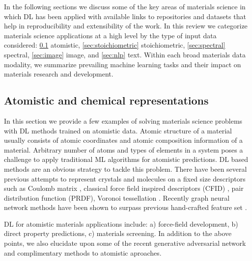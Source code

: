 \documentclass[pdflatex,sn-mathphys]{sn-jnl}%
\theoremstyle{thmstyleone}%
\theoremstyle{thmstyletwo}%
\theoremstyle{thmstylethree}%
\begin{document}



In the following sections we discuss some of the key areas of materials science in which DL has been applied with available links to repositories and datasets that help in reproducibility and extensibility of the work.
In this review we categorize materials science applications at a high level by the type of input data considered: \ref{sec:atomistic} atomistic, \ref{sec:stoichiometric} stoichiometric, \ref{sec:spectral} spectral, \ref{sec:image} image, and \ref{sec:nlp} text.
Within each broad materials data modality, we summarize prevailing machine learning tasks and their impact on materials research and development.


\subsection{Atomistic and chemical representations}\label{sec:atomistic}
 In this section we provide a few examples of solving materials science problems with DL methods trained on atomistic data. Atomic structure of a material usually consists of atomic coordinates and atomic composition information of a material. Arbitrary number of atoms and types of elements in a system poses a challenge to apply traditional ML algorithms for atomistic predictions. DL based methods are an obvious strategy to tackle this problem. There have been several previous attempts to represent crystals and molecules on a fixed size descriptors such as Coulomb matrix \cite{rupp2012fast,bartok2013representing,faber2017prediction}, classical force field inspired descriptors (CFID) \cite{choudhary2018machine,choudhary2021high,choudhary2020data}, pair distribution function (PRDF), Voronoi tessellation \cite{ward2017including,isayev2017universal,liu2019using}. Recently graph neural network methods have been shown to surpass previous hand-crafted feature set \cite{kearnes2016molecular}. 
 
 DL for atomistic materials applications include: a) force-field development, b) direct property predictions, c) materials screening. In addition to the above points, we also elucidate upon some of the recent generative adversarial network and complimentary methods to atomistic aproaches.
 
\end{document}
